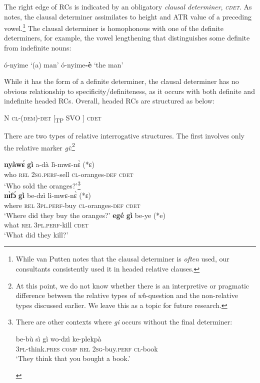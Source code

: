 \documentclass[output=paper]{langscibook}
\begin{document}
The right edge of RCs is indicated by an obligatory \textit{clausal determiner}, \textit{\textsc{cdet}}.  As \citet{van2014information} notes, the clausal determiner assimilates to height and ATR value of a preceding vowel.\footnote{While van Putten notes that the clausal determiner is \textit{often} used, our consultants 
consistently used it in headed relative clauses.}   The clausal determiner is homophonous with one of the definite determiners, for example, the vowel lengthening that distinguishes some definite from indefinite nouns:

\ea
\begin{xlist}
\ex 
\'{o}-nyime `(a) man'
\ex
\'{o}-nyime\textbf{-\`e} `the man'
\end{xlist}
\z

While it has the form of a definite determiner, the clausal determiner has no obvious relationship to specificity/definiteness, as it occurs with both definite and indefinite headed RCs.  Overall, headed RCs are structured as below:

\ea N  \textsc{cl}-(\textsc{dem})-\textsc{det} [\textsubscript{TP}   SVO ]   \textsc{cdet}
\z

There are two types of relative interrogative structures.  The first involves only the relative marker \textit{gi}:\footnote{At this point, we do not know whether there is an interpretive or pragmatic difference between the relative types of \textit{wh}-question and the non-relative types discussed earlier.  We leave this as a topic for future research.}

\ea
\begin{xlist}
\ex
\gll \textbf{ny\`{a}w\'{ɛ}} \textbf{g\`{i}} a-d\`{a} l\`{i}-mwɛ-n\`{ɛ} (*ɛ)\\
who \textsc{rel} \textsc{2sg.perf}-sell \textsc{cl}-oranges-\textsc{def} \textsc{cdet}  \\
\glt `Who sold the oranges?’\footnote{There are other contexts where \textit{gi} occurs without the final determiner:
\begin{exe}
\sn
\gll  be-b\`{u} s\`{i} g\`{i} wo-dz\`{i} ke-plekp\`{a} \\
3\textsc{pl}-think.\textsc{pres} \textsc{comp} \textsc{rel} 2\textsc{sg}-buy.\textsc{perf} \textsc{cl}-book \\
\glt `They think that you bought a book.’
\end{exe}
}\\

\ex
\gll \textbf{n\`{ɪ}f\'{ɔ}} \textbf{g\`{i}} be-dz\`{i} l\`{i}-mwɛ-n\`{ɛ} (*ɛ)\\
where \textsc{rel} \textsc{3pl.perf}-buy \textsc{cl}-oranges-\textsc{def} \textsc{cdet}  \\
\glt `Where did they buy the oranges?’
\ex
\gll \textbf{eg\'{e}} \textbf{g\`{i}} be-ye (*e) \\
what \textsc{rel} \textsc{3pl.perf}-kill \textsc{cdet}  \\
\glt `What did they kill?'
\end{xlist}
\z
\end{document}
